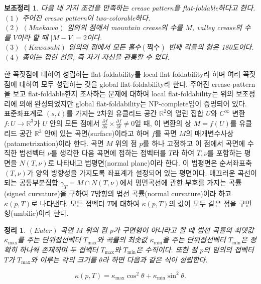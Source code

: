 \documentclass[11pt]{article}
\newtheorem{lemma}{보조정리}
\newtheorem{theorem}{정리}
\begin{document}
\begin{lemma}
다음 네 가지 조건을 만족하는 crease pattern을 flat-foldable하다고 한다.
\\ $(1)$ 주어진 crease pattern이 two-colorable하다.
\\ $(2)$ $(Maekawa)$ 임의의 점에서 mountain crease의 수를 $M$, valley crease의 수를 $V$이라 할 때 $|M-V|=2$이다.
\\ $(3)$ $(Kawasaki)$ 임의의 점에서 모든 홀수$(짝수)$ 번째 각들의 합은 180도이다.
\\ $(4)$ 종이는 접힌 선을, 즉 자기 자신을 관통할 수 없다.
\end{lemma}


한 꼭짓점에 대하여 성립하는 flat-foldability를 local flat-foldability라 하며 여러 꼭짓점에 대하여 모두 성립하는 것을 global flat-foldability라 한다. 주어진 crease pattern을 보고 flat-foldable한지 조사하는 문제에 대하여 local flat-foldability는 위의 보조정리에 의해 완성되었지만 global flat-foldability는 NP-complete임이 증명되어 있다. \cite{1}
\\

표준좌표계로 $(s,t)$를 가지는 2차원 유클리드 공간 ${\mathbb R}^2$의 열린 집합 $U$와 $C^\infty$ 변환 $f:U\to {\mathbb R}^3$가 $U$ 안의 모든 점에서 $\frac{\partial f}{\partial s} \times \frac{\partial f}{\partial t} \ne 0 $일 때, 이 변환의 상 $M=f(U)$를 유클리드 공간 ${\mathbb R}^3$ 안에 있는 곡면(surface)이라고 하며 $f$를 곡면 $M$의 매개변수사상(patametrization)이라 한다. 곡면 $M$ 위의 점 $p$를 하나 고정하고 이 점에서 곡면에 수직한 법선벡터 $\nu$를 생각한 다음 곡면에 접하는 접벡터를 $T$라 하여 $T,\nu$를 포함하는 평면을 $N(T,\nu)$로 나타내고 법평면(normal plane)이라 한다. 이 법평면은 순서좌표축 $( T,\nu)$가 양의 방향성을 가지도록 좌표계가 설정되어 있는 평면이다. 매끄러운 곡선이 되는 공통부분집합 $\gamma_T = M\cap N(T,\nu)$에서 평면곡선에 관한 부호를 가지는 곡률(signed curvature)을 구하여 $T$방향의 법선 곡률(normal curvature)이라 하고 $\kappa (p,T)$로 나타낸다. 모든 접벡터 $T$에 대하여 $\kappa(p,T)$의 값이 모두 같은 점을 구면형(umbilic)이라 한다. \cite{10}


\begin{theorem}
$(Euler)$ 곡면 $M$ 위의 점 $p$가 구면형이 아니라고 할 때 법선 곡률의 최댓값 $\kappa_{\max}$를 주는 단위접선벡터 $T_{\max}$와 곡률의 최솟값 $\kappa_{\min}$을 주는 단위접선벡터 $T_{\min}$은 정확히 하나씩 존재하며 두 접벡터 $T_{\max}$와 $T_{\min}$은 수직이다. 또한 점 $p$의 임의의 접벡터 $T$가 $T_{\max}$와 이루는 각의 크기를 $\theta$라 하면 다음과 같은 식이 성립한다.


\begin{equation}
\kappa (p,T)=\kappa_{\max} \cos ^2 \theta+\kappa_{\min} \sin ^2 \theta. \nonumber
\end{equation}

\end{theorem}
\end{document}
